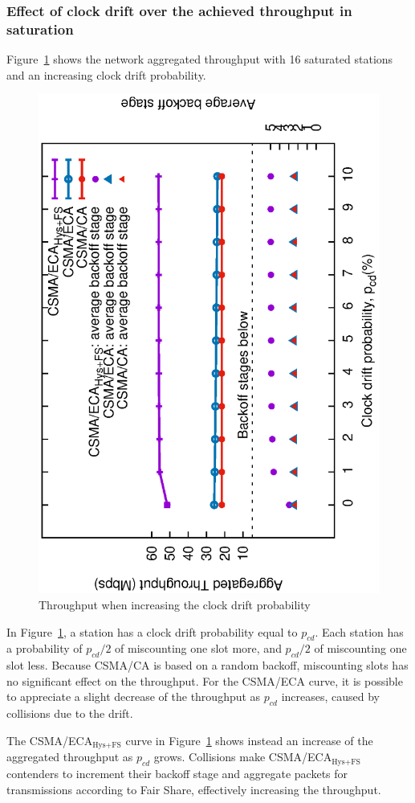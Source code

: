 	\subsubsection{Effect of clock drift over the achieved throughput in saturation}\label{performanceClockDrift}
	Figure~\ref{fig:clockDrift} shows the network aggregated throughput with 16 saturated stations and an increasing clock drift probability.
	
	\begin{figure}[tb]
	\centering
		\includegraphics[width=0.7\linewidth,angle=-90]{figures/clockDrift/throughput_and_BOS_w_SD-TON.eps}
		\caption{Throughput when increasing the clock drift probability}
		\label{fig:clockDrift}
	\end{figure}
	
	In Figure~\ref{fig:clockDrift}, a station has a clock drift probability equal to $p_{cd}$. Each station has a probability of $p_{cd}/2$ of miscounting one slot more, and $p_{cd}/2$ of miscounting one slot less. Because CSMA/CA is based on a random backoff, miscounting slots has no significant effect on the throughput. For the CSMA/ECA curve, it is possible to appreciate a slight decrease of the throughput as $p_{cd}$ increases, caused by collisions due to the drift.
	
	The CSMA/ECA$_{\text{Hys+FS}}$ curve in Figure~\ref{fig:clockDrift} shows instead an increase of the aggregated throughput as $p_{cd}$ grows. Collisions make CSMA/ECA$_{\text{Hys+FS}}$ contenders to increment their backoff stage and aggregate packets for transmissions according to Fair Share, effectively increasing the throughput. 
	
